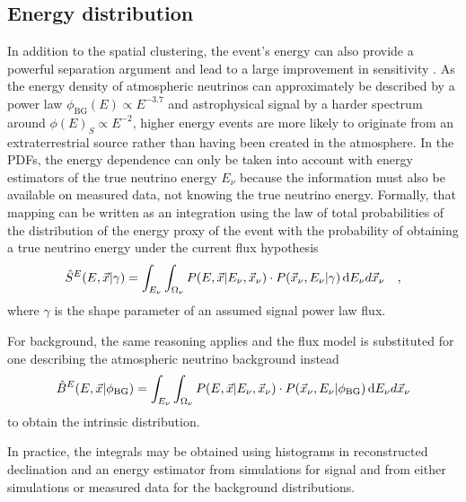 \subsection{Energy distribution}
In addition to the spatial clustering, the event's energy can also provide a powerful separation argument and lead to a large improvement in sensitivity .
As the energy density of atmospheric neutrinos can approximately be described by a power law $\phi_\mathrm{BG}(E) \propto E^{-3.7}$ and astrophysical signal by a harder spectrum around $\phi(E)_S \propto E^{-2}$, higher energy events are more likely to originate from an extraterrestrial source rather than having been created in the atmosphere.
In the PDFs, the energy dependence can only be taken into account with energy estimators of the true neutrino energy $E_\nu$ because the information must also be available on measured data, not knowing the true neutrino energy.
Formally, that mapping can be written as an integration using the law of total probabilities of the distribution of the energy proxy of the event with the probability of obtaining a true neutrino energy under the current flux hypothesis
\begin{equation}
  \hat{S}^E(E, \vec{x}|\gamma) =
    \int_{E_\nu}\int_{\Omega_\nu}
    P(E, \vec{x}|E_\nu, \vec{x}_\nu) \cdot P(\vec{x}_\nu, E_\nu|\gamma)
    \,\mathrm{d}E_\nu d{\vec{x}_\nu}
    \quad\text{,}
\end{equation}
where $\gamma$ is the shape parameter of an assumed signal power law flux.

For background, the same reasoning applies and the flux model is substituted for one describing the atmospheric neutrino background instead
\begin{equation}
  \hat{B}^E(E, \vec{x}|\phi_\mathrm{BG}) =
    \int_{E_\nu}\int_{\Omega_\nu}
    P(E, \vec{x}|E_\nu, \vec{x}_\nu) \cdot P(\vec{x}_\nu, E_\nu|\phi_\mathrm{BG})
    \,\mathrm{d}E_\nu d{\vec{x}_\nu}
\end{equation}
to obtain the intrinsic distribution.

In practice, the integrals may be obtained using histograms in reconstructed declination and an energy estimator from simulations for signal and from either simulations or measured data for the background distributions.

